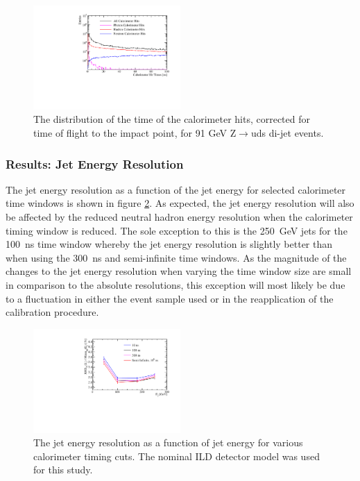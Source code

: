\begin{figure}[h!]
\centering
\includegraphics[width=0.5\textwidth]{OptimisationStudies/Plots/Description/CalorimeterHitTimes_91GeV_Z_uds_Steel.pdf}
\caption[The distribution of the time of the calorimeter hits, corrected for time of flight to the impact point, for 91 GeV Z$\rightarrow$uds di-jet events.]{The distribution of the time of the calorimeter hits, corrected for time of flight to the impact point, for 91 GeV Z$\rightarrow$uds di-jet events.}
\label{fig:calohittiming}
\end{figure} 


\subsubsection{Results: Jet Energy Resolution}
The jet energy resolution as a function of the jet energy for selected calorimeter time windows is shown in figure \ref{fig:jertimingcuts}.  As expected, the jet energy resolution will also be affected by the reduced neutral hadron energy resolution when the calorimeter timing window is reduced.  The sole exception to this is the 250~GeV jets for the 100~ns time window whereby the jet energy resolution is slightly better than when using the 300~ns and semi-infinite time windows.  As the magnitude of the changes to the jet energy resolution when varying the time window size are small in comparison to the absolute resolutions, this exception will most likely be due to a fluctuation in either the event sample used or in the reapplication of the calibration procedure.  

\begin{figure}[h!]
\includegraphics[width=0.5\textwidth]{EnergyEstimators/Plots/TimingCuts/JER_vs_JetEnergy_TimingCutStudies.pdf}
\caption[The jet energy resolution as a function of jet energy for various calorimeter timing cuts.  The results shown use the nominal ILD detector model.]{The jet energy resolution as a function of jet energy for various calorimeter timing cuts.  The nominal ILD detector model was used for this study.}
\label{fig:jertimingcuts}
\end{figure}

